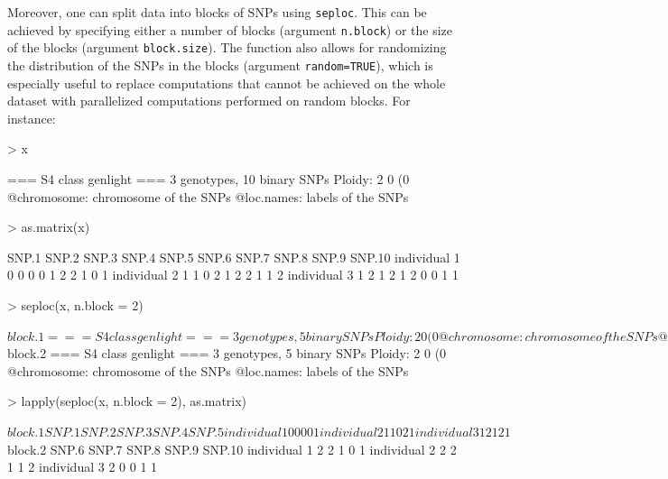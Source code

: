 \documentclass{article}
\begin{document}
Moreover, one can split data into blocks of SNPs using \texttt{seploc}.
This can be achieved by specifying either a number of blocks (argument \texttt{n.block}) or the size
of the blocks (argument \texttt{block.size}). The function also allows for randomizing the
distribution of the SNPs in the blocks (argument \texttt{random=TRUE}), which is especially useful
to replace computations that cannot be achieved on the whole dataset with parallelized computations performed on random blocks.
For instance:
\begin{Schunk}
\begin{Sinput}
> x
\end{Sinput}
\begin{Soutput}
 === S4 class genlight ===
 3 genotypes,  10 binary SNPs
 Ploidy: 2
 0 (0 %
 @chromosome: chromosome of the SNPs
 @loc.names: labels of the SNPs
\end{Soutput}
\begin{Sinput}
> as.matrix(x)
\end{Sinput}
\begin{Soutput}
             SNP.1 SNP.2 SNP.3 SNP.4 SNP.5 SNP.6 SNP.7 SNP.8 SNP.9 SNP.10
individual 1     0     0     0     0     1     2     2     1     0      1
individual 2     1     1     0     2     1     2     2     1     1      2
individual 3     1     2     1     2     1     2     0     0     1      1
\end{Soutput}
\begin{Sinput}
> seploc(x, n.block = 2)
\end{Sinput}
\begin{Soutput}
$block.1
 === S4 class genlight ===
 3 genotypes,  5 binary SNPs
 Ploidy: 2
 0 (0 %
 @chromosome: chromosome of the SNPs
 @loc.names: labels of the SNPs

$block.2
 === S4 class genlight ===
 3 genotypes,  5 binary SNPs
 Ploidy: 2
 0 (0 %
 @chromosome: chromosome of the SNPs
 @loc.names: labels of the SNPs
\end{Soutput}
\begin{Sinput}
> lapply(seploc(x, n.block = 2), as.matrix)
\end{Sinput}
\begin{Soutput}
$block.1
             SNP.1 SNP.2 SNP.3 SNP.4 SNP.5
individual 1     0     0     0     0     1
individual 2     1     1     0     2     1
individual 3     1     2     1     2     1

$block.2
             SNP.6 SNP.7 SNP.8 SNP.9 SNP.10
individual 1     2     2     1     0      1
individual 2     2     2     1     1      2
individual 3     2     0     0     1      1
\end{Soutput}
\end{Schunk}
\end{document}

